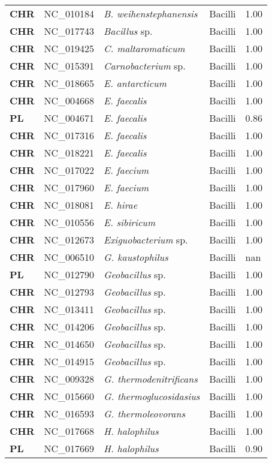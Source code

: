 \begin{adjustwidth}{-3cm}{2cm}
{\begin{supertabular}{>{\bfseries}l|p{0.1\textwidth}p{0.14\textwidth}l|l}
CHR & NC\_010184 & \textit{B. weihenstephanensis} & Bacilli & 1.00\\
CHR & NC\_017743 & \textit{Bacillus} sp. & Bacilli & 1.00\\
CHR & NC\_019425 & \textit{C. maltaromaticum} & Bacilli & 1.00\\
CHR & NC\_015391 & \textit{Carnobacterium} sp. & Bacilli & 1.00\\
CHR & NC\_018665 & \textit{E. antarcticum} & Bacilli & 1.00\\
CHR & NC\_004668 & \textit{E. faecalis} & Bacilli & 1.00\\
PL & NC\_004671 & \textit{E. faecalis} & Bacilli & 0.86\\
CHR & NC\_017316 & \textit{E. faecalis} & Bacilli & 1.00\\
CHR & NC\_018221 & \textit{E. faecalis} & Bacilli & 1.00\\
CHR & NC\_017022 & \textit{E. faecium} & Bacilli & 1.00\\
CHR & NC\_017960 & \textit{E. faecium} & Bacilli & 1.00\\
CHR & NC\_018081 & \textit{E. hirae} & Bacilli & 1.00\\
CHR & NC\_010556 & \textit{E. sibiricum} & Bacilli & 1.00\\
CHR & NC\_012673 & \textit{Exiguobacterium} sp. & Bacilli & 1.00\\
CHR & NC\_006510 & \textit{G. kaustophilus} & Bacilli & nan\\
PL & NC\_012790 & \textit{Geobacillus} sp. & Bacilli & 1.00\\
CHR & NC\_012793 & \textit{Geobacillus} sp. & Bacilli & 1.00\\
CHR & NC\_013411 & \textit{Geobacillus} sp. & Bacilli & 1.00\\
CHR & NC\_014206 & \textit{Geobacillus} sp. & Bacilli & 1.00\\
CHR & NC\_014650 & \textit{Geobacillus} sp. & Bacilli & 1.00\\
CHR & NC\_014915 & \textit{Geobacillus} sp. & Bacilli & 1.00\\
CHR & NC\_009328 & \textit{G. thermodenitrificans} & Bacilli & 1.00\\
CHR & NC\_015660 & \textit{G. thermoglucosidasius} & Bacilli & 1.00\\
CHR & NC\_016593 & \textit{G. thermoleovorans} & Bacilli & 1.00\\
CHR & NC\_017668 & \textit{H. halophilus} & Bacilli & 1.00\\
PL & NC\_017669 & \textit{H. halophilus} & Bacilli & 0.90\\

\end{supertabular}}
\end{adjustwidth}
